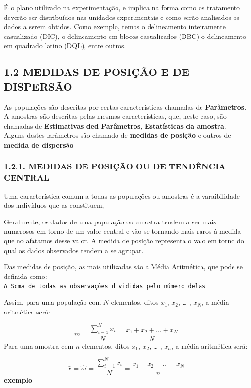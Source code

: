 \documentclass[
]{article}
\begin{document}
É o plano utilizado na experimentação, e implica na forma como os
tratamento deverão ser distribuídos nas unidades experimentais e como
serão analisados os dados a serem obtidos. Como exemplo, temos o
delineamento inteiramente casualizado (DIC), o delineamento em blocos
casualizados (DBC) o delineamento em quadrado latino (DQL), entre
outros.

\hypertarget{medidas-de-posiuxe7uxe3o-e-de-dispersuxe3o}{%
\subsection{1.2 MEDIDAS DE POSIÇÃO E DE
DISPERSÃO}\label{medidas-de-posiuxe7uxe3o-e-de-dispersuxe3o}}

As populações são descritas por certas características chamadas de
\textbf{Parâmetros}. A amostras são descritas pelas mesmas
características, que, neste caso, são chamadas de \textbf{Estimativas
ded Parâmetros}, \textbf{Estatísticas da amostra}. Alguns destes
larâmetros são chamado de \textbf{medidas de posição} e outros de
\textbf{medida de dispersão}

\hypertarget{medidas-de-posiuxe7uxe3o-ou-de-tenduxeancia-central}{%
\subsubsection{1.2.1. MEDIDAS DE POSIÇÃO OU DE TENDÊNCIA
CENTRAL}\label{medidas-de-posiuxe7uxe3o-ou-de-tenduxeancia-central}}

Uma característica comum a todas as populações ou amostras é a
varaibilidade dos indivíduos que as constituem,

Geralmente, os dados de uma população ou amostra tendem a ser mais
numerosos em torno de um valor central e vão se tornando mais raros à
medida que no afatamos desse valor. A medida de posição representa o
valo em torno do qual os dados observados tendem a se agrupar.

Das medidas de posição, as mais utilizadas são a Média Aritmética, que
pode se definida como:
\texttt{A\ Soma\ de\ todas\ as\ observações\ divididas\ pelo\ número\ delas}

Assim, para uma população com \(N\) elementos, ditos \(x_1\), \(x_2\),
\ldots{} , \(x_N\), a média aritmética será:

\[
m = \frac{\sum_{i=1}^{N}x_i}{N} = \frac{x_1+x_2+...+x_N}{N}
\] Para uma amostra com \(n\) elementos, ditos \(x_1\), \(x_2\),
\ldots{} , \(x_n\), a média aritmética será:

\[
\bar{x}=\hat{m} = \frac{\sum_{i=1}^{N}x_i}{N} = \frac{x_1+x_2+...+x_N}{n}
\] \textbf{exemplo}
\end{document}
